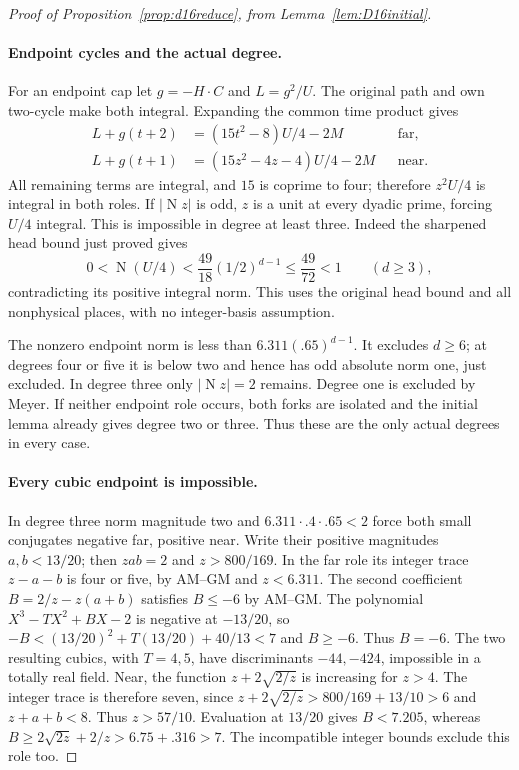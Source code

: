 \documentclass[11pt]{article}
\newcommand{\N}{\operatorname{N}}
\begin{document}
\begin{proof}[Proof of Proposition~\ref{prop:d16reduce}, from
Lemma~\ref{lem:D16initial}]
\paragraph{Endpoint cycles and the actual degree.}
For an endpoint cap let $g=-H\cdot C$ and $L=g^2/U$.
The original path and own two-cycle make both integral. Expanding
the common time product gives
\[
\begin{split}
L+g(t+2)&=(15t^2-8)U/4-2M&&\text{far},\\
L+g(t+1)&=(15z^2-4z-4)U/4-2M&&\text{near}.
\end{split}
\]
All remaining terms are integral, and $15$ is coprime to four;
therefore $z^2U/4$ is integral in both roles.
If $|\N z|$ is odd, $z$ is a unit at every dyadic prime, forcing
$U/4$ integral. This is impossible in degree at least three.
Indeed the sharpened head bound just proved gives
\[
 0<\N(U/4)<\frac{49}{18}(1/2)^{d-1}\le\frac{49}{72}<1
 \qquad(d\ge3),
\]
contradicting its positive integral norm. This uses the original
head bound and all nonphysical places, with no integer-basis assumption.

The nonzero endpoint norm is less than $6.311(.65)^{d-1}$.
It excludes $d\ge6$; at degrees four or five it is below two and
hence has odd absolute norm one, just excluded. In degree three
only $|\N z|=2$ remains. Degree one is excluded by Meyer.
If neither endpoint role occurs, both forks are isolated and the
initial lemma already gives degree two or three. Thus these are the
only actual degrees in every case.

\paragraph{Every cubic endpoint is impossible.}
In degree three norm magnitude two and
$6.311\cdot.4\cdot.65<2$ force both small conjugates negative
far, positive near. Write their positive magnitudes $a,b<13/20$;
then $zab=2$ and $z>800/169$.
In the far role its integer trace $z-a-b$ is four or five, by
AM--GM and $z<6.311$. The second coefficient
$B=2/z-z(a+b)$ satisfies $B\le-6$ by AM--GM.
The polynomial $X^3-TX^2+BX-2$ is negative at $-13/20$,
so $-B<(13/20)^2+T(13/20)+40/13<7$ and $B\ge-6$.
Thus $B=-6$. The two resulting cubics, with $T=4,5$, have
discriminants $-44,-424$, impossible in a totally real field.
Near, the function $z+2\sqrt{2/z}$ is increasing for $z>4$.
The integer trace is therefore seven, since
$z+2\sqrt{2/z}>800/169+13/10>6$ and $z+a+b<8$.
Thus $z>57/10$. Evaluation at $13/20$ gives $B<7.205$,
whereas $B\ge2\sqrt{2z}+2/z>6.75+.316>7$.
The incompatible integer bounds exclude this role too.


\end{proof}
\end{document}
